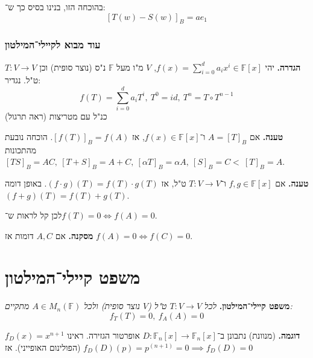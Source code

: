 \documentclass[]{article}
\newcommand\F         {\mathbb{F}}
\newcommand\co        {\colon}
\newcommand\ag        {\alpha}
\theoremstyle{definition}
\begin{document}
	בהוכחה הזו, בנינו בסיס כך ש־: 
	\[ [T(w) - S(w)]_B = ae_1 \]
	
	\subsubsection{עוד מבוא לקיילי־המילטון}
	\textbf{הגדרה. }יהי $f(x) = \sum_{i = 0}^{d}a_ix^i \in \F[x]$, $V$ מ"ו מעל $\F$ נ"ס (נוצר סופית) וכן $T \co V \to V$ ט"ל. נגדיר: 
	\[ f(T) = \sum_{i = 0}^{d}a_iT^{i}, \ T^0 = id, \ T^{n} = T \circ T^{n - 1} \]
	כנ"ל עם מטריצות (ראה תרגול)
	
	\textbf{טענה. }אם $A = [T]_B$ ו־$f(x) \in \F[x]$, אז $[f(T)]_B = f(A)$. הוכחה נובעת מהתכונות $[TS]_B = AC, \ [T + S]_B = A + C, \ [\ag T]_B = \ag A, \ [S]_B = C<\ [T]_B = A$. 
	
	\textbf{טענה. }אם $f, g \in \F[x]$ ו־$T \co V \to V$ ט"ל, אז $(f \cdot g)(T) = f(T) \cdot g(T)$. באופן דומה $(f + g)(T) = f(T) + g(T)$. 
	
	לכן קל לראות ש־$f(T) = 0 \iff f(A) = 0$. 
	
	\textbf{מסקנה. }אם $A, C$ דומות אז $f(A) = 0 \iff f(C) = 0$. 
	
	\section{משפט קיילי־המילטון}
	\textbf{משפט קיילי־המילטון. }\textit{לכל $T\co V \to V$ ט"ל ($V$ נוצר סופית) ולכל $A \in M_n(\F)$ מתקיים: 
	\[ f_T(T) = 0, \ f_A(A) = 0 \]}
	
	\textbf{דוגמה. }(מנוונת) נתבונן ב־$D \co \F_n[x] \to \F_n[x]$ אופרטור הגזירה. ראינו $f_D(x) = x^{n + 1}$ (הפולינום האופייני). אז $f_D(D)(p) = p^{(n + 1)} = 0 \implies f_D(D) = 0$
	
\end{document}

